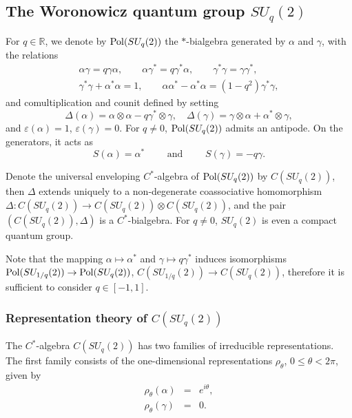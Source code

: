 \documentclass[12pt]{amsart}
\theoremstyle{definition}
\theoremstyle{remark}
\numberwithin{equation}{section}
\begin{document}
\subsection{The Woronowicz quantum group $SU_q(2)$}

\cite{woronowicz87,woronowicz87b} For $q\in\mathbb{R}$, we denote by ${\rm
  Pol} (SU_q(2))$ the $*$-bialgebra generated by $\alpha$ and $\gamma$, with the relations
\begin{gather*}
\alpha \gamma = q \gamma \alpha, \qquad \alpha \gamma^* = q \gamma^*
\alpha, \qquad\gamma^* \gamma = \gamma \gamma^*, \\
\gamma^* \gamma + \alpha^*
\alpha = 1, \qquad \alpha \alpha^* - \alpha^*\alpha = (1-q^2) \gamma^* \gamma,
\end{gather*}
and comultiplication and counit defined by setting
\[
\Delta (\alpha) = \alpha\otimes\alpha - q \gamma^*\otimes \gamma, \quad
\Delta(\gamma) = \gamma\otimes \alpha + \alpha^* \otimes \gamma,
\]
and $\varepsilon(\alpha) = 1$, $\varepsilon(\gamma) =0$. For $q\not=0$, ${\rm
  Pol} (SU_{q}(2))$ admits an antipode. On the generators, it acts as
\[
S(\alpha)=\alpha^* \qquad\mbox{ and }\qquad S(\gamma)=-q\gamma.
\]

Denote the universal enveloping $C^*$-algebra of ${\rm Pol}(SU_q(2))$ by
$C(SU_q(2))$, then $\Delta$ extends uniquely to a non-degenerate coassociative
homomorphism $\Delta:C(SU_q(2))\to C(SU_q(2))\otimes C(SU_q(2))$, and the pair
$(C(SU_q(2)),\Delta)$ is a $C^*$-bialgebra. For $q\not=0$, $SU_q(2)$ is even a compact quantum group.

Note that the mapping $\alpha\mapsto \alpha^*$ and $\gamma\mapsto q\gamma^*$
induces isomorphisms ${\rm Pol}(SU_{1/q}(2))\to{\rm Pol} (SU_q(2))$,
$C(SU_{1/q}(2))\to C(SU_q(2))$, therefore it is sufficient to consider $q\in[-1,1]$.

\subsubsection{Representation theory of $C(SU_q(2))$} \cite{woronowicz87b,
vaksman+soibelman88} The $C^*$-algebra $C(SU_q(2))$ has two families of irreducible
representations. The first family consists of the one-dimensional representations $\rho_\theta$,
$0\le \theta < 2\pi$, given by
\begin{eqnarray*}
\rho_\theta(\alpha) &=& e^{i\theta}, \\
\rho_\theta(\gamma) &=& 0.
\end{eqnarray*}
\end{document}
